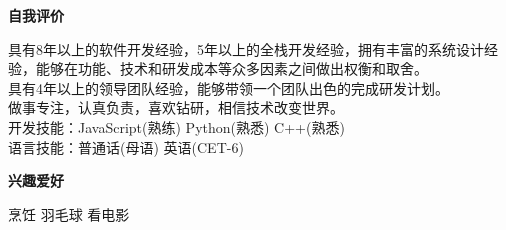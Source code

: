 \documentclass[a4paper]{article}
\newenvironment{changemargin}[2]{%
  \begin{list}{}{%
    \setlength{\topsep}{0pt}%
    \setlength{\leftmargin}{#1}%
    \setlength{\rightmargin}{#2}%
    \setlength{\listparindent}{\parindent}%
    \setlength{\itemindent}{\parindent}%
    \setlength{\parsep}{\parskip}%
  }%
  \item[]}{\end{list}
}
\newcommand{\lineover}{
	\begin{changemargin}{-0.05in}{-0.05in}
		\vspace*{-8pt}
		\hrulefill \\
		\vspace*{-2pt}
	\end{changemargin}
}
\newcommand{\header}[1]{
	\begin{changemargin}{-0.5in}{-0.5in}
	\fontsize{12}{14} \scshape{\textbf{#1}}\\
	\end{changemargin}
}
\newenvironment{body} {
	\vspace*{-16pt}
	\begin{changemargin}{-0.5in}{-0.5in}
  }	
	{\end{changemargin}
}
\begin{document}



\header{自我评价}

\begin{body}
	\vspace{14pt}
	具有8年以上的软件开发经验，5年以上的全栈开发经验，拥有丰富的系统设计经验，能够在功能、技术和研发成本等众多因素之间做出权衡和取舍。\\
	具有4年以上的领导团队经验，能够带领一个团队出色的完成研发计划。\\
	做事专注，认真负责，喜欢钻研，相信技术改变世界。\\
	开发技能：{\fontarial JavaScript}(熟练) {\fontarial Python}(熟悉) {\fontarial C++}(熟悉)\\
	语言技能：普通话(母语) 英语({\fontarial CET-6})\\
\end{body}

\medskip





\header{兴趣爱好}

\begin{body}
	\vspace{14pt}
	烹饪 羽毛球 看电影\\
\end{body}
\end{document}

